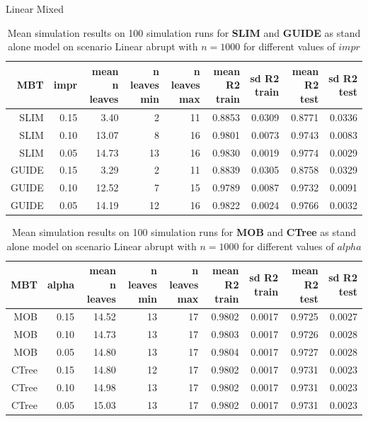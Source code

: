 \documentclass[9pt, xcolor=table]{beamer}
\begin{document}
\begin{frame}{Linear Mixed}
\begin{table}

\caption{Mean simulation results on 100 simulation runs for \textbf{SLIM} and \textbf{GUIDE}  as stand alone model on scenario Linear abrupt with $n = 1000$ for different values of $impr$}
\centering \tiny
\begin{tabular}[t]{r|r|r|r|r|r|r|r|r}
\hline
MBT & impr & mean n leaves & n leaves min & n leaves max & mean R2 train & sd R2 train & mean R2 test & sd R2 test\\
\hline
SLIM & 0.15 & 3.40 & 2 & 11 & 0.8853 & 0.0309 & 0.8771 & 0.0336\\
\hline
SLIM & 0.10 & 13.07 & 8 & 16 & 0.9801 & 0.0073 & 0.9743 & 0.0083\\
\hline
SLIM & 0.05 & 14.73 & 13 & 16 & 0.9830 & 0.0019 & 0.9774 & 0.0029\\
\hline
GUIDE & 0.15 & 3.29 & 2 & 11 & 0.8839 & 0.0305 & 0.8758 & 0.0329\\
\hline
GUIDE & 0.10 & 12.52 & 7 & 15 & 0.9789 & 0.0087 & 0.9732 & 0.0091\\
\hline
GUIDE & 0.05 & 14.19 & 12 & 16 & 0.9822 & 0.0024 & 0.9766 & 0.0032\\
\hline
\end{tabular}
\end{table}

\begin{table}

\caption{Mean simulation results on 100 simulation runs for \textbf{MOB} and \textbf{CTree}  as stand alone model on scenario Linear abrupt with $n = 1000$ for different values of $alpha$}
\centering \tiny
\begin{tabular}[t]{r|r|r|r|r|r|r|r|r}
\hline
MBT & alpha & mean n leaves & n leaves min & n leaves max & mean R2 train & sd R2 train & mean R2 test & sd R2 test\\
\hline
MOB & 0.15 & 14.52 & 13 & 17 & 0.9802 & 0.0017 & 0.9725 & 0.0027\\
\hline
MOB & 0.10 & 14.73 & 13 & 17 & 0.9803 & 0.0017 & 0.9726 & 0.0028\\
\hline
MOB & 0.05 & 14.80 & 13 & 17 & 0.9804 & 0.0017 & 0.9727 & 0.0028\\
\hline
CTree & 0.15 & 14.80 & 12 & 17 & 0.9802 & 0.0017 & 0.9731 & 0.0023\\
\hline
CTree & 0.10 & 14.98 & 13 & 17 & 0.9802 & 0.0017 & 0.9731 & 0.0023\\
\hline
CTree & 0.05 & 15.03 & 13 & 17 & 0.9802 & 0.0017 & 0.9731 & 0.0023\\
\hline
\end{tabular}
\end{table}
    
\end{frame}
\end{document}
